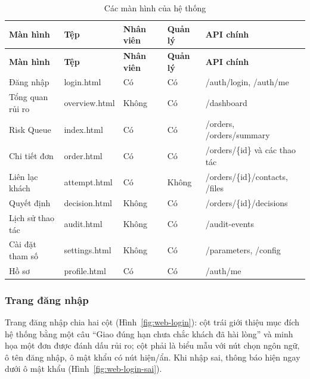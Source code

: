 {\small
\renewcommand{\arraystretch}{1.25}
\begin{longtable}{|>{\raggedright\arraybackslash}p{3.1cm}|>{\raggedright\arraybackslash}p{2.3cm}|>{\raggedright\arraybackslash}p{1.5cm}|>{\raggedright\arraybackslash}p{1.5cm}|>{\raggedright\arraybackslash}p{5.2cm}|}
\caption{Các màn hình của hệ thống}\label{tab:man-hinh}\\ \hline
\textbf{Màn hình} & \textbf{Tệp} & \textbf{Nhân viên} & \textbf{Quản lý} & \textbf{API chính} \\ \hline \endfirsthead
\hline \textbf{Màn hình} & \textbf{Tệp} & \textbf{Nhân viên} & \textbf{Quản lý} & \textbf{API chính} \\ \hline \endhead
Đăng nhập & login.html & Có & Có & /auth/login, /auth/me \\ \hline
Tổng quan rủi ro & overview.html & Không & Có & /dashboard \\ \hline
Risk Queue & index.html & Có & Có & /orders, /orders/summary \\ \hline
Chi tiết đơn & order.html & Có & Có & /orders/\{id\} và các thao tác \\ \hline
Liên lạc khách & attempt.html & Có & Không & /orders/\{id\}/contacts, /files \\ \hline
Quyết định & decision.html & Không & Có & /orders/\{id\}/decisions \\ \hline
Lịch sử thao tác & audit.html & Không & Có & /audit-events \\ \hline
Cài đặt tham số & settings.html & Không & Có & /parameters, /config \\ \hline
Hồ sơ & profile.html & Có & Có & /auth/me \\ \hline
\end{longtable}
}

\subsubsection{Trang đăng nhập}

Trang đăng nhập chia hai cột (Hình~\ref{fig:web-login}): cột trái giới thiệu mục đích hệ thống bằng
một câu ``Giao đúng hạn chưa chắc khách đã hài lòng'' và minh họa một đơn được đánh dấu rủi ro; cột
phải là biểu mẫu với nút chọn ngôn ngữ, ô tên đăng nhập, ô mật khẩu có nút hiện/ẩn. Khi nhập sai,
thông báo hiện ngay dưới ô mật khẩu (Hình~\ref{fig:web-login-sai}).


